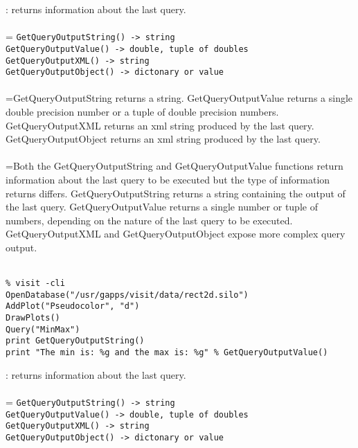 \documentclass[10pt,a4paper]{report}
\begin{document}
{}
: returns information about the last query.\\[-3mm]

 \\ 
\hangindent=\parindent 
\verb!GetQueryOutputString() -> string!\\ 
\verb!GetQueryOutputValue() -> double, tuple of doubles!\\ 
\verb!GetQueryOutputXML() -> string!\\ 
\verb!GetQueryOutputObject() -> dictonary or value!\\ [-3mm]

 \\ 
\hangindent=\parindent GetQueryOutputString returns a string. GetQueryOutputValue returns a single double precision number or a tuple of double precision numbers. GetQueryOutputXML returns an xml string produced by the last query. GetQueryOutputObject returns an xml string produced by the last query. \\[-3mm] 

 \\ 
\hangindent=\parindent Both the GetQueryOutputString and GetQueryOutputValue functions return information about the last query to be executed but the type of information returns differs. GetQueryOutputString returns a string containing the output of the last query. GetQueryOutputValue returns a single number or tuple of numbers, depending on the nature of the last query to be executed.  GetQueryOutputXML and GetQueryOutputObject expose more complex query output. \\[-3mm] 

\\[-6mm]
\begin{verbatim}% visit -cli
OpenDatabase("/usr/gapps/visit/data/rect2d.silo")
AddPlot("Pseudocolor", "d")
DrawPlots()
Query("MinMax")
print GetQueryOutputString()
print "The min is: %g and the max is: %g" % GetQueryOutputValue()
\end{verbatim}
\newpage


{}
: returns information about the last query.\\[-3mm]

 \\ 
\hangindent=\parindent 
\verb!GetQueryOutputString() -> string!\\ 
\verb!GetQueryOutputValue() -> double, tuple of doubles!\\ 
\verb!GetQueryOutputXML() -> string!\\ 
\verb!GetQueryOutputObject() -> dictonary or value!\\ [-3mm]
\end{document}
